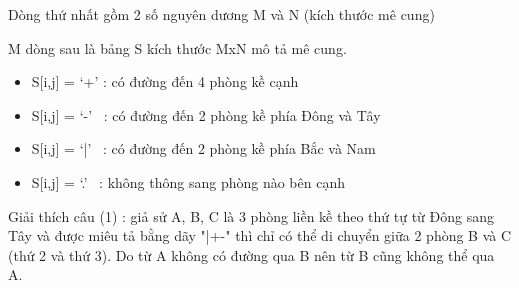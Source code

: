 Dòng thứ nhất gồm 2 số nguyên dương M và N (kích thước mê cung)

M dòng sau là bảng S kích thước MxN mô tả mê cung.
\begin{itemize}
	\item S[i,j] = ‘+’ : có đường đến 4 phòng kề cạnh
	\item S[i,j] = ‘-’  : có đường đến 2 phòng kề phía Đông và Tây
	\item S[i,j] = ‘|’  : có đường đến 2 phòng kề phía Bắc và Nam
	\item S[i,j] = ‘.’  : không thông sang phòng nào bên cạnh
\end{itemize}

Giải thích câu (1) : giả sử A, B, C là 3 phòng liền kề theo thứ tự từ Đông sang Tây và được miêu tả bằng dãy "|+-" thì chỉ có thể di chuyển giữa 2 phòng B và C (thứ 2 và thứ 3). Do từ A không có đường qua B nên từ B cũng không thể qua A.